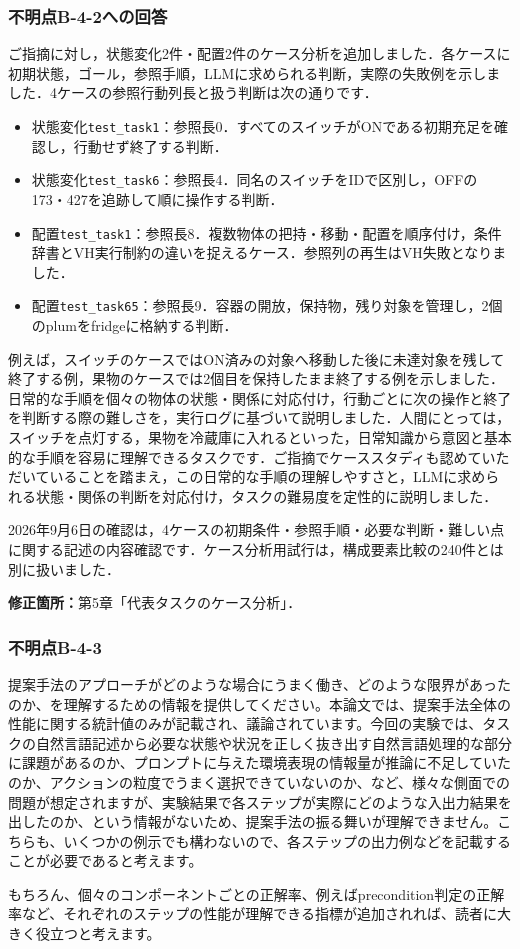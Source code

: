 \documentclass{jsarticle}
\begin{document}
\subsubsection*{不明点B-4-2への回答}
ご指摘に対し，状態変化2件・配置2件のケース分析を追加しました．各ケースに初期状態，ゴール，参照手順，LLMに求められる判断，実際の失敗例を示しました．4ケースの参照行動列長と扱う判断は次の通りです．
\begin{itemize}
\item 状態変化\texttt{test\_task1}：参照長0．すべてのスイッチがONである初期充足を確認し，行動せず終了する判断．
\item 状態変化\texttt{test\_task6}：参照長4．同名のスイッチをIDで区別し，OFFの173・427を追跡して順に操作する判断．
\item 配置\texttt{test\_task1}：参照長8．複数物体の把持・移動・配置を順序付け，条件辞書とVH実行制約の違いを捉えるケース．参照列の再生はVH失敗となりました．
\item 配置\texttt{test\_task65}：参照長9．容器の開放，保持物，残り対象を管理し，2個のplumをfridgeに格納する判断．
\end{itemize}

例えば，スイッチのケースではON済みの対象へ移動した後に未達対象を残して終了する例，果物のケースでは2個目を保持したまま終了する例を示しました．日常的な手順を個々の物体の状態・関係に対応付け，行動ごとに次の操作と終了を判断する際の難しさを，実行ログに基づいて説明しました．人間にとっては，スイッチを点灯する，果物を冷蔵庫に入れるといった，日常知識から意図と基本的な手順を容易に理解できるタスクです．ご指摘でケーススタディも認めていただいていることを踏まえ，この日常的な手順の理解しやすさと，LLMに求められる状態・関係の判断を対応付け，タスクの難易度を定性的に説明しました．

2026年9月6日の確認は，4ケースの初期条件・参照手順・必要な判断・難しい点に関する記述の内容確認です．ケース分析用試行は，構成要素比較の240件とは別に扱いました．

\noindent\textbf{修正箇所：}第5章「代表タスクのケース分析」．


\subsubsection*{不明点B-4-3}
\begin{screen}
提案手法のアプローチがどのような場合にうまく働き、どのような限界があったのか、を理解するための情報を提供してください。本論文では、提案手法全体の性能に関する統計値のみが記載され、議論されています。今回の実験では、タスクの自然言語記述から必要な状態や状況を正しく抜き出す自然言語処理的な部分に課題があるのか、プロンプトに与えた環境表現の情報量が推論に不足していたのか、アクションの粒度でうまく選択できていないのか、など、様々な側面での問題が想定されますが、実験結果で各ステップが実際にどのような入出力結果を出したのか、という情報がないため、提案手法の振る舞いが理解できません。こちらも、いくつかの例示でも構わないので、各ステップの出力例などを記載することが必要であると考えます。

もちろん、個々のコンポーネントごとの正解率、例えばprecondition判定の正解率など、それぞれのステップの性能が理解できる指標が追加されれば、読者に大きく役立つと考えます。
\end{screen}
\end{document}
